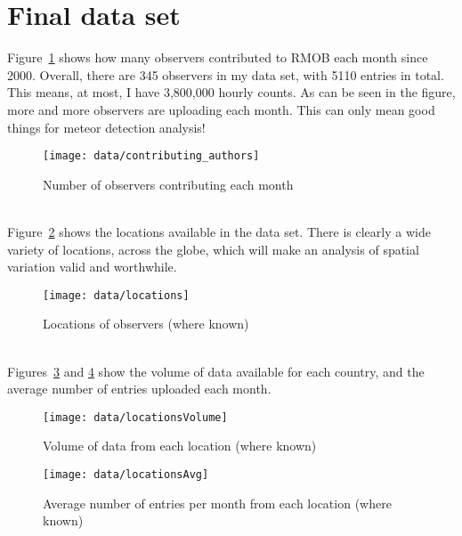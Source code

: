 \section{Final data set}
Figure~\ref{fig:data:contr} shows how many observers contributed to RMOB each month since 2000. Overall, there are 345 observers in my data set, with 5110 entries in total. This means, at most, I have 3,800,000 hourly counts. As can be seen in the figure, more and more observers are uploading each month. This can only mean good things for meteor detection analysis!
\begin{figure}[h!]
	\centering
	\texttt{[image: data/contributing\_authors]}
	\caption{Number of observers contributing each month
		\label{fig:data:contr}}
\end{figure}\\
Figure~\ref{fig:data:loc} shows the locations available in the data set. There is clearly a wide variety of locations, across the globe, which will make an analysis of spatial variation valid and worthwhile. 
\begin{figure}[h!]
	\centering
	\texttt{[image: data/locations]}
	\caption{Locations of observers (where known)
		\label{fig:data:loc}}
\end{figure}\\
Figures~\ref{fig:data:locvol} and \ref{fig:data:locavg} show the volume of data available for each country, and the average number of entries uploaded each month.
\begin{figure}[h!]
	\centering
	\texttt{[image: data/locationsVolume]}
	\caption{Volume of data from each location (where known)
		\label{fig:data:locvol}}
\end{figure}
\begin{figure}[h!]
	\centering
	\texttt{[image: data/locationsAvg]}
	\caption{Average number of entries per month from each location (where known)
		\label{fig:data:locavg}}
\end{figure}